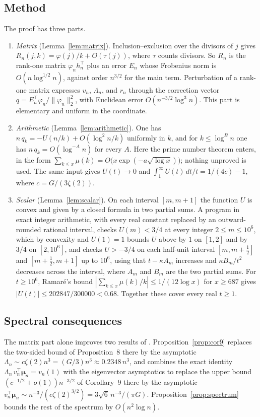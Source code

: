 \documentclass[11pt]{article}
\theoremstyle{remark}\newtheorem{remark}[theorem]{Remark}
\newcommand{\muvec}{\boldsymbol\mu}
\begin{document}
\subsection*{Method}
The proof has three parts.
\begin{enumerate}
\item \emph{Matrix} (Lemma~\ref{lem:matrix}). Inclusion--exclusion over the divisors of $j$ gives $R_n(j,k)=\varphi(j)/k+O(\tau(j))$, where $\tau$ counts divisors. So $R_n$ is the rank-one matrix $\varphi_nh_n^\top$ plus an error $E_n$ whose Frobenius norm is $O(n\log^{1/2}n)$, against order $n^{3/2}$ for the main term. Perturbation of a rank-one matrix expresses $v_n$, $\Lambda_n$, and $r_n$ through the correction vector $q=E_n^\top\varphi_n/\|\varphi_n\|_2^2$, with Euclidean error $O(n^{-3/2}\log^3n)$. This part is elementary and uniform in the coordinate.
\item \emph{Arithmetic} (Lemma~\ref{lem:arithmetic}). One has $n\,q_k=-U(n/k)+O(\log^2n/k)$ uniformly in $k$, and for $k\le\log^Bn$ one has $n\,q_k=O(\log^{-A}n)$ for every $A$. Here the prime number theorem enters, in the form $\sum_{k\le x}\mu(k)=O\bigl(x\exp(-a\sqrt{\log x})\bigr)$; nothing unproved is used. The same input gives $U(t)\to0$ and $\int_1^\infty U(t)\,dt/t=1/(4c)-1$, where $c=G/(3\zeta(2))$.
\item \emph{Scalar} (Lemma~\ref{lem:scalar}). On each interval $[m,m+1]$ the function $U$ is convex and given by a closed formula in two partial sums. A program in exact integer arithmetic, with every real constant replaced by an outward-rounded rational interval, checks $U(m)<3/4$ at every integer $2\le m\le10^6$, which by convexity and $U(1)=1$ bounds $U$ above by $1$ on $[1,2]$ and by $3/4$ on $[2,10^6]$, and checks $U>-3/4$ on each half-unit interval $[m,m+\tfrac12]$ and $[m+\tfrac12,m+1]$ up to $10^6$, using that $t-\kappa A_m$ increases and $\kappa B_m/t^2$ decreases across the interval, where $A_m$ and $B_m$ are the two partial sums. For $t\ge10^6$, Ramar\'e's bound $|\sum_{k\le x}\mu(k)/k|\le1/(12\log x)$ for $x\ge687$ \cite{ramare} gives $|U(t)|\le202847/300000<0.68$. Together these cover every real $t\ge1$.
\end{enumerate}

\subsection*{Spectral consequences}
The matrix part alone improves two results of \cite{kline}. Proposition~\ref{prop:cor9} replaces the two-sided bound of Proposition~8 there by the asymptotic $\Lambda_n\sim c\zeta(2)n^3=(G/3)n^3\approx0.2348\,n^3$, and combines the exact identity $\Lambda_n\,v_n^\top\muvec_n=v_n(1)$ with the eigenvector asymptotics to replace the upper bound $(c^{-1/2}+o(1))n^{-3/2}$ of Corollary~9 there by the asymptotic $v_n^\top\muvec_n\sim n^{-3}/(c\zeta(2)^{3/2})=3\sqrt6\,n^{-3}/(\pi G)$. Proposition~\ref{prop:spectrum} bounds the rest of the spectrum by $O(n^2\log n)$.
\end{document}
